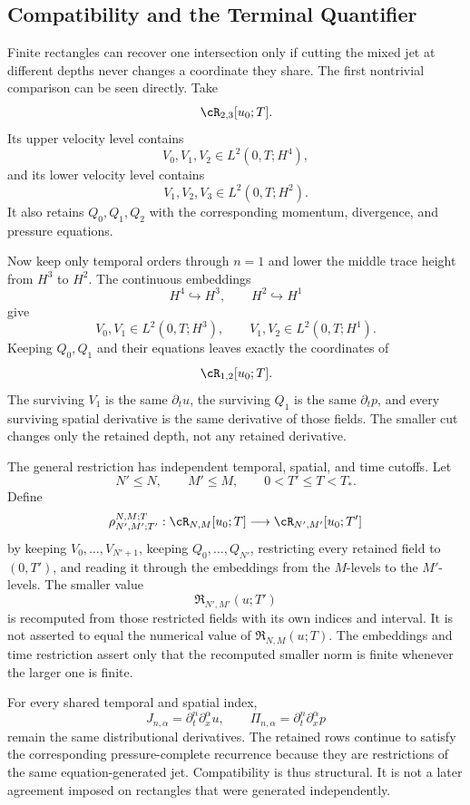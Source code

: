 
\subsection{Compatibility and the Terminal Quantifier}\label{sub:CompatibilityAndTheTerminalQuantifier}

Finite rectangles can recover one intersection only if cutting the mixed jet at different depths never changes a coordinate they share.
The first nontrivial comparison can be seen directly.
Take
\[
  \cR_{2,3}[u_0;T].
\]
Its upper velocity level contains
\[
  V_0,V_1,V_2
  \in
  L^2(0,T;H^4),
\]
and its lower velocity level contains
\[
  V_1,V_2,V_3
  \in
  L^2(0,T;H^2).
\]
It also retains \(Q_0,Q_1,Q_2\) with the corresponding momentum, divergence, and pressure equations.

Now keep only temporal orders through \(n=1\) and lower the middle trace height from \(H^3\) to \(H^2\).
The continuous embeddings
\[
  H^4\hookrightarrow H^3,
  \qquad
  H^2\hookrightarrow H^1
\]
give
\[
  V_0,V_1
  \in
  L^2(0,T;H^3),
  \qquad
  V_1,V_2
  \in
  L^2(0,T;H^1).
\]
Keeping \(Q_0,Q_1\) and their equations leaves exactly the coordinates of
\[
  \cR_{1,2}[u_0;T].
\]
The surviving \(V_1\) is the same \(\partial_tu\), the surviving \(Q_1\) is the same \(\partial_tp\), and every surviving spatial derivative is the same derivative of those fields.
The smaller cut changes only the retained depth, not any retained derivative.

The general restriction has independent temporal, spatial, and time cutoffs.
Let
\[
  N'\le N,
  \qquad
  M'\le M,
  \qquad
  0<T'\le T<T_*.
\]
Define
\[
  \rho_{N',M';T'}^{N,M;T}:
  \cR_{N,M}[u_0;T]
  \longrightarrow
  \cR_{N',M'}[u_0;T']
\]
by keeping \(V_0,\ldots,V_{N'+1}\), keeping \(Q_0,\ldots,Q_{N'}\), restricting every retained field to \((0,T')\), and reading it through the embeddings from the \(M\)-levels to the \(M'\)-levels.
The smaller value
\[
  \mathfrak R_{N',M'}(u;T')
\]
is recomputed from those restricted fields with its own indices and interval.
It is not asserted to equal the numerical value of \(\mathfrak R_{N,M}(u;T)\).
The embeddings and time restriction assert only that the recomputed smaller norm is finite whenever the larger one is finite.

For every shared temporal and spatial index,
\[
  J_{n,\alpha}
  =
  \partial_t^n\partial_x^\alpha u,
  \qquad
  \Pi_{n,\alpha}
  =
  \partial_t^n\partial_x^\alpha p
\]
remain the same distributional derivatives.
The retained rows continue to satisfy the corresponding pressure-complete recurrence because they are restrictions of the same equation-generated jet.
Compatibility is thus structural.
It is not a later agreement imposed on rectangles that were generated independently.

